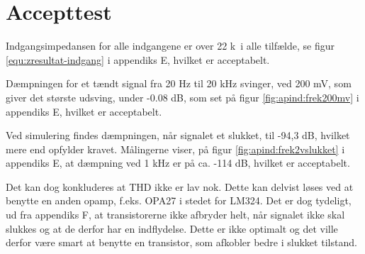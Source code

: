 \section{Accepttest}
Indgangsimpedansen for alle indgangene er over 22 k\ohm~i alle tilfælde, se figur \ref{equ:zresultat-indgang} i appendiks E, hvilket er acceptabelt. 

Dæmpningen for et tændt signal fra 20 Hz til 20 kHz svinger, ved 200 mV, som giver det største udsving, under -0.08 dB, som set på figur \ref{fig:apind:frek200mv} i appendiks E, hvilket er acceptabelt.

Ved simulering findes dæmpningen, når signalet et slukket, til -94,3 dB, hvilket mere end opfylder kravet.
Målingerne viser, på figur \ref{fig:apind:frek2vslukket} i appendiks E, at dæmpning ved 1 kHz er på ca. -114 dB, hvilket er acceptabelt.

Det kan dog konkluderes at THD ikke er lav nok. Dette kan delvist løses ved at benytte en anden opamp, f.eks. OPA27 i stedet for LM324. Det er dog tydeligt, ud fra appendiks F, at transistorerne ikke afbryder helt, når signalet ikke skal slukkes og at de derfor har en indflydelse. Dette er ikke optimalt og det ville derfor være smart at benytte en transistor, som afkobler bedre i slukket tilstand.